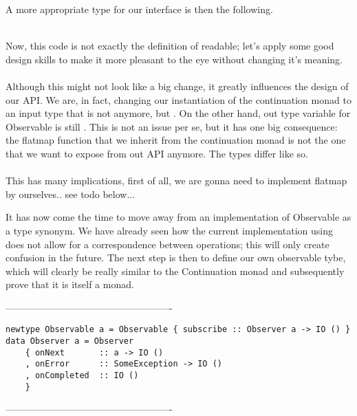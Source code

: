 A more appropriate type for our interface is then the following.\\

\\


Now, this code is not exactly the definition of readable; let's apply some good design skills to make it more pleasant to the eye without changing it's meaning.\\

\\

Although this might not look like a big change, it greatly influences the design of our API. We are, in fact, changing our instantiation of the continuation monad to an input type that is not  anymore, but . On the other hand, out type variable for Observable is still . This is not an issue per se, but it has one big consequence: the flatmap function that we inherit from the continuation monad is not the one that we want to expose from out API anymore. The types differ like so.\\

\\

This has many implications, first of all, we are gonna need to implement flatmap by ourselves.. see todo below...

It has now come the time to move away from an implementation of Observable as a type synonym. We have already seen how the current implementation using  does not allow for a correspondence between \code{>>=} operations; this will only create confusion in the future. The next step is then to define our own observable tybe, which will clearly be really similar to the Continuation monad and subsequently prove that it is itself a monad. 

----------------------------------------------------
\begin{verbatim}
newtype Observable a = Observable { subscribe :: Observer a -> IO () } 
data Observer a = Observer 
    { onNext       :: a -> IO ()
    , onError      :: SomeException -> IO ()
    , onCompleted  :: IO ()
    }
\end{verbatim}
----------------------------------------------------    

